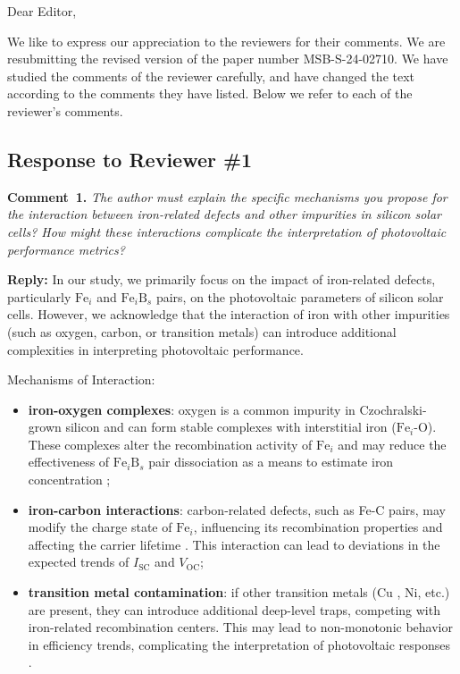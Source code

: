 \documentclass[a4paper,fleqn]{cas-sc}
\begin{document}
\shorttitle{}


Dear Editor,

We like to express our appreciation to the reviewers for their comments.
We are resubmitting the revised version of the paper number MSB-S-24-02710.
We have studied the comments of the reviewer carefully, and have changed the text according to the comments they
have listed.
Below we refer to each of the reviewer’s comments.


\subsection*{Response to Reviewer \#1 }

\noindent
\textcolor[rgb]{0.00,0.50,1.00}{\textbf{Comment~1.}}
\emph{The author must explain the specific mechanisms you propose for the interaction between iron-related defects and other impurities in silicon solar cells? How might these interactions complicate the interpretation of photovoltaic performance metrics?}

\noindent
\textcolor[rgb]{0.51,0.00,0.00}{\textbf{Reply:}}
In our study, we primarily focus on the impact of iron-related defects, particularly $\mathrm{Fe}_i$ and $\mathrm{Fe}_i\mathrm{B}_s$ pairs, on the photovoltaic parameters of silicon solar cells. However, we acknowledge that the interaction of iron with other impurities (such as oxygen, carbon, or transition metals) can introduce additional complexities in interpreting photovoltaic performance.

Mechanisms of Interaction:
\begin{itemize}
    \item \textbf{iron-oxygen complexes}: oxygen is a common impurity in Czochralski-grown silicon and can form stable complexes with interstitial iron ($\mathrm{Fe}_i$-O). These complexes alter the recombination activity of $\mathrm{Fe}_i$ and may reduce the effectiveness of $\mathrm{Fe}_i\mathrm{B}_s$ pair dissociation as a means to estimate iron concentration \cite{istratov1999};
    \item \textbf{iron-carbon interactions}: carbon-related defects, such as Fe-C pairs, may modify the charge state of $\mathrm{Fe}_i$, influencing its recombination properties and affecting the carrier lifetime \cite{kustov1992}. This interaction can lead to deviations in the expected trends of $I_\mathrm{SC}$ and $V_\mathrm{OC}$;
    \item \textbf{transition metal contamination}: if other transition metals (Cu , Ni, etc.) \cite{coletti2011} are present, they can introduce additional deep-level traps, competing with iron-related recombination centers. This may lead to non-monotonic behavior in efficiency trends, complicating the interpretation of photovoltaic responses .
\end{itemize}
\end{document}
